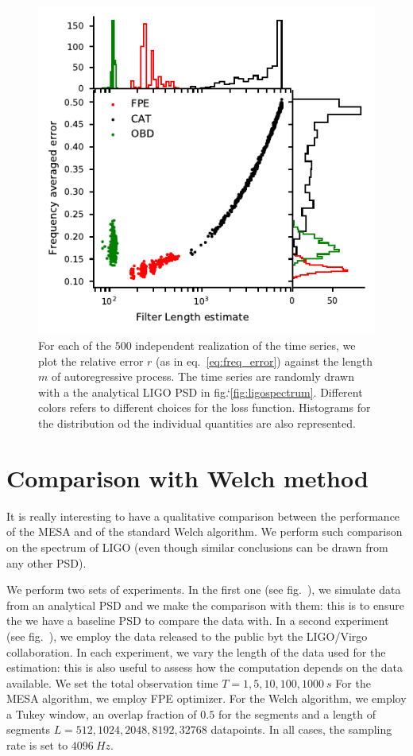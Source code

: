 \documentclass[twocolumn,showpacs,preprintnumbers,nofootinbib,prd,
superscriptaddress,10pt]{revtex4-1}
\begin{document}
\begin{figure}
    \centering
    \includegraphics[width = \linewidth]{Images/optimisers_comparison/ligo/error_length_contour.pdf}
    \caption{For each of the $500$ independent realization of the time series, we plot the relative error $r$ (as in eq.~\ref{eq:freq_error}) against the length $m$ of autoregressive process. The time series are randomly drawn with a the analytical LIGO PSD in fig.`\ref{fig:ligospectrum}. Different colors refers to different choices for the loss function. Histograms for the distribution od the individual quantities are also represented.}
    \label{fig:LigoOrderError}
\end{figure}

\section{Comparison with Welch method}

It is really interesting to have a qualitative comparison between the performance of the MESA and of the standard Welch algorithm.
We perform such comparison on the spectrum of LIGO (even though similar conclusions can be drawn from any other PSD).

We perform two sets of experiments.
In the first one (see fig.~), we simulate data from an analytical PSD and we make the comparison with them: this is to ensure the we have a baseline PSD to compare the data with.
In a second experiment (see fig.~), we employ the data released to the public byt the LIGO/Virgo collaboration.
In each experiment, we vary the length of the data used for the estimation: this is also useful to assess how the computation depends on the data available. We set the total observation time $T = 1, 5, 10, 100, 1000 \SI{}{s}$
For the MESA algorithm, we employ FPE optimizer. For the Welch algorithm, we employ a Tukey window, an overlap fraction of $0.5$ for the segments and a length of segments $L = 512, 1024, 2048, 8192, 32768$ datapoints.
In all cases, the sampling rate is set to $\SI{4096}{Hz}$.
\end{document}
